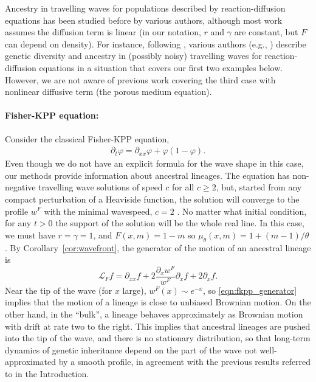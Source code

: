 \documentclass[EJP]{ejpecp} %
\newcommand{\Lgen}{\mathcal{L}}    %
\newcommand{\citet}[1]{\cite{#1}}
\newcommand{\citep}[1]{\cite{#1}}
\begin{document}
Ancestry in travelling waves for populations described by reaction-diffusion equations
has been studied before by various authors, 
although most work assumes the diffusion term is linear
(in our notation, $r$ and $\gamma$ are constant,
but $F$ can depend on density).
For instance, following \citet{hallatschek/nelson:2008},
various authors (e.g., \citet{roques2012allee,birzu/hallatschek/korolev:2017})
describe genetic diversity
and ancestry in (possibly noisy) travelling waves for reaction-diffusion equations
in a situation that covers our first two examples below.
However, we are not aware of previous work covering the third case 
with nonlinear diffusive term (the porous medium equation).

\paragraph{Fisher-KPP equation:}
Consider the classical Fisher-KPP equation,
\begin{align} \label{eqn:fkpp}
    \partial_t\varphi = \partial_{xx}\varphi + \varphi (1-\varphi) .
\end{align}
Even though we do not have an explicit formula for the wave shape in this case,
our methods provide information about ancestral lineages.
The equation has non-negative travelling wave solutions of 
speed $c$ for all $c \geq 2$, 
but, started from any compact perturbation of a Heaviside function, the 
solution will converge to the profile $w^F$ with the minimal wavespeed, $c=2$
\citep{kolmogorov/petrovsky/piscounov:1937,fife1977approach,bramson:1983}.
No matter what initial condition,
for any $t>0$ the support of the 
solution will be the whole real line. 
In this case, we must have $r = \gamma = 1$,
and $F(x, m) = 1 - m$ so $\mu_\theta(x, m) = 1 + (m-1)/\theta$.
By Corollary~\ref{cor:wavefront},
the generator of the motion of an ancestral lineage is
\begin{equation} \label{eqn:fkpp_generator}
    \Lgen_F  f
    =
    \partial_{xx}f + 2 \frac{\partial_xw^F}{w^F} \partial_x f + 2 \partial_xf .
\end{equation}
Near the tip of the wave (for $x$ large), $w^F(x) \sim e^{-x}$,
so \eqref{eqn:fkpp_generator} implies that
the motion of a lineage is close to unbiased Brownian motion.
On the other hand, in the ``bulk'', %
a lineage behaves approximately as
Brownian motion with drift at rate two to the right.
This implies that
ancestral lineages are pushed into the tip of the wave,
and there is no stationary distribution,
so that long-term dynamics of genetic inheritance
depend on the part of the wave not well-approximated by a smooth profile,
in agreement with the previous results referred to in the Introduction.
\end{document}

